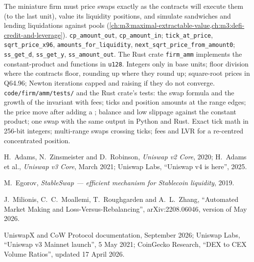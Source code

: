 \begin{build}
 The miniature firm must price swaps exactly as the contracts will execute them (to the last unit), value its liquidity positions, and
simulate sandwiches and lending liquidations against pools (\cref{ch:m3:maximal-extractable-value,ch:m3:defi-credit-and-leverage}).
 \texttt{cp\_amount\_out}, \texttt{cp\_amount\_in}; \texttt{tick\_at\_price}, \texttt{sqrt\_price\_x96},
\texttt{amounts\_for\_liquidity}, \texttt{next\_sqrt\_price\_from\_amount0}; \texttt{ss\_get\_d}, \texttt{ss\_get\_y}, \texttt{ss\_amount\_out}. The Rust
crate \texttt{firm\_amm} implements the constant-product and  functions in \texttt{u128}.
 Integers only in  base units; floor division where the contracts floor, rounding up where they round up; square-root prices in Q64.96;
Newton iterations capped and raising if they do not converge.
 \texttt{code/firm/amm/tests/} and the Rust crate's tests: the swap formula and the growth of the invariant with fees; ticks and position
amounts at the range edges; the price move after adding a ;  balance and low slippage against the constant product; one swap with the same
output in Python and Rust.
 Exact tick math in 256-bit integers; multi-range swaps crossing ticks; fees and LVR for a re-centred concentrated position.
\end{build}

\begin{omsources}
\item H.~Adams, N.~Zinsmeister and D.~Robinson, \emph{Uniswap v2 Core}, 2020; H.~Adams et al., \emph{Uniswap v3 Core}, March 2021; Uniswap Labs, ``Uniswap v4 is
here'', 2025.
\item M.~Egorov, \emph{StableSwap --- efficient mechanism for Stablecoin liquidity}, 2019.
\item J.~Milionis, C.~C.~Moallemi, T.~Roughgarden and A.~L.~Zhang, ``Automated Market Making and Loss-Versus-Rebalancing'', arXiv:2208.06046, version of May
2026.
\item UniswapX and CoW Protocol documentation, September 2026; Uniswap Labs, ``Uniswap v3 Mainnet launch'', 5 May 2021; CoinGecko Research, ``DEX to
CEX Volume Ratios'', updated 17 April 2026.
\end{omsources}

